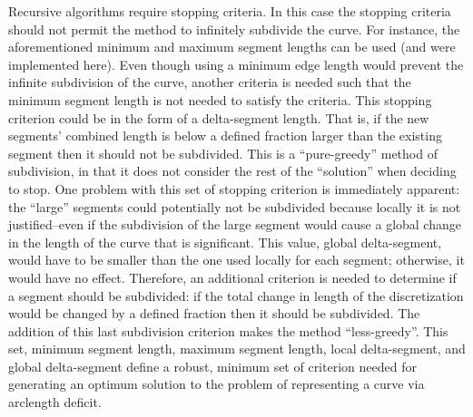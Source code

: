 Recursive algorithms require stopping criteria. In this case the stopping 
criteria should not permit the method to infinitely subdivide the curve. 
For instance, the aforementioned minimum and maximum segment lengths can 
be used (and were implemented here). Even though using a minimum edge 
length would prevent the infinite subdivision of the curve, another 
criteria is needed such that the minimum segment length is not needed to 
satisfy the criteria. This stopping criterion could be in the form of a 
delta-segment length. That is, if the new segments' combined length is 
below a defined fraction larger than the existing segment then it should 
not be subdivided. This is a ``pure-greedy'' method of subdivision, in 
that it does not consider the rest of the ``solution'' when deciding to 
stop. One problem with this set of stopping criterion is immediately 
apparent: the ``large'' segments could potentially not be subdivided 
because locally it is not justified--even if the subdivision of the large 
segment would cause a global change in the length of the curve that is 
significant. This value, global delta-segment, would have to be smaller 
than the one used locally for each segment; otherwise, it would have no 
effect. Therefore, an additional criterion is needed to determine if a 
segment should be subdivided: if the total change in length of the 
discretization would be changed by a defined fraction then it should be 
subdivided. The addition of this last subdivision criterion makes the 
method ``less-greedy''. This set, minimum segment length, maximum segment 
length, local delta-segment, and global delta-segment define a robust, 
minimum set of criterion needed for generating an optimum solution to the 
problem of representing a curve via arclength deficit.

